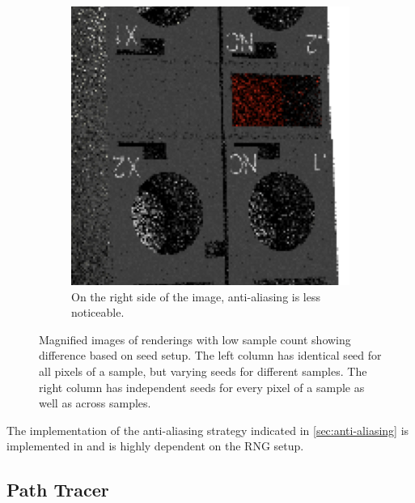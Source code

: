 \begin{figure}[H]
\begin{subfigure}[t]{0.3\textwidth}
        \includegraphics[width=\textwidth]{resources/good-seed-anti-aliasing.png}
        \caption{On the right side of the image, anti-aliasing is less noticeable.}
        \label{fig:rngNoiseArtifactsHighlightsGoodAnti}
    \end{subfigure}
    \hspace*{2cm}
    \caption{Magnified images of renderings with low sample count showing difference based on seed setup. The left column has identical seed for all pixels of a sample, but varying seeds for different samples. The right column has independent seeds for every pixel of a sample as well as across samples.}
    \label{fig:rngNoiseArtifactsHighlights}
\end{figure}

\label{sec:anti-aliasing-implementation}
The implementation of the anti-aliasing strategy indicated in \ref{sec:anti-aliasing} is implemented in  and is highly dependent on the \gls{RNG} setup.

\subsection*{Path Tracer}

